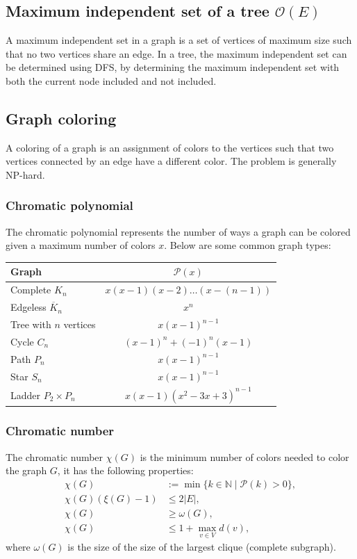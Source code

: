 \subsection{Maximum independent set of a tree $\mathcal O(E)$}

A maximum independent set in a graph is a set of vertices of maximum size such that no two vertices share an edge. In a tree, the maximum independent set can be determined using DFS, by determining the maximum independent set with both the current node included and not included.



\subsection{Graph coloring}

A coloring of a graph is an assignment of colors to the vertices such that two vertices connected by an edge have a different color. The problem is generally NP-hard.

\subsubsection{Chromatic polynomial}
The chromatic polynomial represents the number of ways a graph can be colored given a maximum number of colors $x$. Below are some common graph types:
\begin{table}[H]
    \centering
    \begin{tabular}{|l|c|}
        \hline
        Graph & $\mathcal P(x)$ \\
        \hline
        Complete $K_n$ & $x(x - 1)(x - 2)\dots(x - (n - 1))$ \\
        Edgeless $\overline K_n$ & $x^n$ \\
        Tree with $n$ vertices & $x(x - 1)^{n - 1}$ \\
        Cycle $C_n$ & $(x - 1)^n + (-1)^n(x - 1)$ \\
        Path $P_n$ & $x(x - 1)^{n - 1}$ \\
        Star $S_n$ & $x(x - 1)^{n - 1}$ \\
        Ladder $P_2 \times P_n$ & $x(x - 1)(x^2 - 3x + 3)^{n - 1}$ \\
        \hline
    \end{tabular}
    \label{tab:chromatic}
\end{table}

\subsubsection{Chromatic number}
The chromatic number $\chi(G)$ is the minimum number of colors needed to color the graph $G$, it has the following properties:
\begin{align*}
    \chi(G) &:= \min\{k \in \mathbb N \mid \mathcal P(k) > 0\}, \\
    \chi(G)(\xi(G) - 1) &\leq 2|E|, \\
    \chi(G) &\geq \omega(G), \\
    \chi(G) &\leq 1 + \max_{v\in V} d(v),
\end{align*}
where $\omega(G)$ is the size of the size of the largest clique (complete subgraph).

